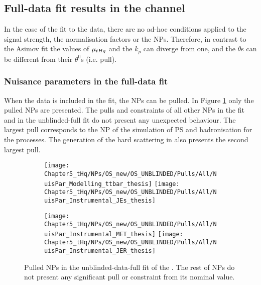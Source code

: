 \begin{comment}
\FloatBarrier 

\end{comment} 

\subsection{Full-data fit results in the \dilepOStau channel}
\label{sec:ChaptH:Fit:fitToData:OS}
In the case of the fit to the data, there are no ad-hoc conditions applied to the signal strength, 
the normalisation factors or the NPs. Therefore, in contrast to the Asimov fit
the values of $\mu_{tHq}$ and the $k_p$ can diverge 
from one, and the $\theta$s can be different from their $\theta^{0}$s (i.e. pull).



\subsubsection{Nuisance parameters in the \dilepOStau full-data fit}
\label{sec:ChaptH:Fit:FullFit:OS:NPs}

When the data is included in the fit, the NPs can be pulled. 
In Figure \ref{fig:ChaptH:fitToData:OS:PulledNPs} only the pulled NPs are presented.
The pulls and constraints of all other NPs in the  fit and in the unblinded-full fit do not present any unexpected behaviour. 
The largest pull corresponds to the NP of the simulation of PS and hadronisation for the \ttbar processes. 
The generation of the hard scattering in \ttbar also presents the second largest pull.

\begin{figure}[h]
\centering
\begin{subfigure}{.52\textwidth}
  \texttt{[image: Chapter5\_tHq/NPs/OS\_new/OS\_UNBLINDED/Pulls/All/NuisPar\_Modelling\_ttbar\_thesis]}
   \texttt{[image: Chapter5\_tHq/NPs/OS\_new/OS\_UNBLINDED/Pulls/All/NuisPar\_Instrumental\_JEs\_thesis]}
\end{subfigure}%
\begin{subfigure}{.48\textwidth}
  \centering
  \texttt{[image: Chapter5\_tHq/NPs/OS\_new/OS\_UNBLINDED/Pulls/All/NuisPar\_Instrumental\_MET\_thesis]}
   \texttt{[image: Chapter5\_tHq/NPs/OS\_new/OS\_UNBLINDED/Pulls/All/NuisPar\_Instrumental\_JER\_thesis]}
\end{subfigure}
\caption{Pulled NPs in the unblinded-data-full fit of the \dilepOStau. 
The rest of NPs do not present any significant pull or constraint from its nominal value.}  
\label{fig:ChaptH:fitToData:OS:PulledNPs}
\end{figure}

